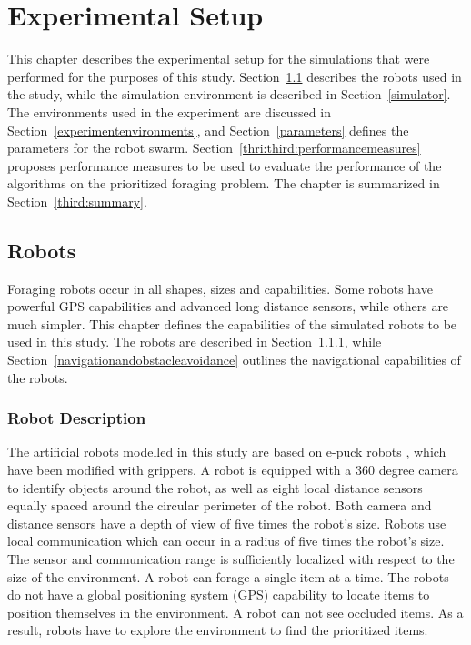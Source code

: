 
\chapter{Experimental Setup}
\label{chap:experiment}


This chapter describes the experimental setup for the simulations that were performed for the purposes of this study. Section~\ref{chap:robots} describes the robots used in the study, while the simulation environment is described in Section~\ref{simulator}. The environments used in the experiment are discussed in Section~\ref{experimentenvironments}, and Section~\ref{parameters} defines the parameters for the robot swarm. Section~\ref{thri:third:performancemeasures} proposes performance measures to be used to evaluate the performance of the algorithms on the prioritized foraging problem. The chapter is summarized in Section~\ref{third:summary}.


\section{Robots}
\label{chap:robots}

Foraging robots occur in all shapes, sizes and capabilities. Some robots have powerful GPS capabilities and advanced long distance sensors, while others are much simpler. This chapter defines the capabilities of the simulated robots to be used in this study. The robots are described in Section~\ref{robotdescription}, while Section~\ref{navigationandobstacleavoidance} outlines the navigational capabilities of the robots. 

\subsection{Robot Description}
\label{robotdescription}

The artificial robots modelled in this study are based on e-puck robots \cite{mondada2009puck}, which have been modified with grippers. A robot is equipped with a 360 degree camera to identify objects around the robot, as well as eight local distance sensors equally spaced around the circular perimeter of the robot. Both camera and distance sensors have a depth of view of five times the robot's size. Robots use local communication which can occur in a radius of five times the robot's size. The sensor and communication range is sufficiently localized with respect to the size of the environment. A robot can forage a single item at a time. The robots do not have a global positioning system (GPS) capability to locate items to position themselves in the environment. A robot can not see occluded items. As a result, robots have to explore the environment to find the prioritized items.


